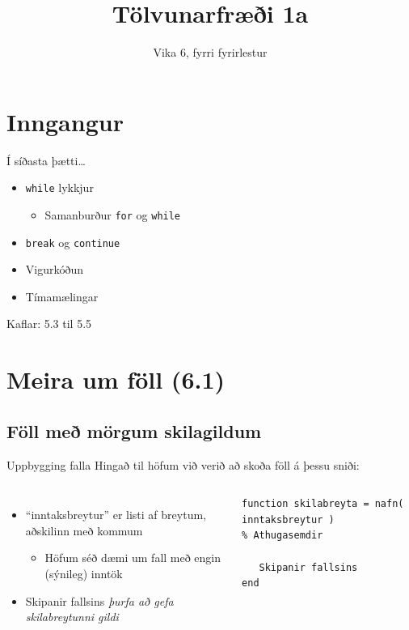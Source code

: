 \documentclass[handout]{beamer}
\title{Tölvunarfræði 1a}
\subtitle{Vika 6, fyrri fyrirlestur}
\begin{document}
\begin{frame}
\titlepage
\end{frame}

\section{Inngangur}

\begin{frame}{Í síðasta þætti\ldots}
\begin{itemize}
 \item \texttt{while} lykkjur
 \begin{itemize}
  \item Samanburður \texttt{for} og \texttt{while}
 \end{itemize}
 \item \texttt{break} og \texttt{continue}
 \item Vigurkóðun
 \item Tímamælingar
\end{itemize}
Kaflar: 5.3 til 5.5
\end{frame}

\section{Meira um föll (6.1)}

\subsection{Föll með mörgum skilagildum}
\begin{frame}[fragile]{Uppbygging falla}
\vspace{\baselineskip}
Hingað til höfum við verið að skoða föll á þessu sniði:
\begin{columns}
\begin{itemize}
 \item ``inntaksbreytur'' er listi af breytum, aðskilinn með kommum
 \begin{itemize}
  \item Höfum séð dæmi um fall með engin (sýnileg) inntök
 \end{itemize}
 \item Skipanir fallsins \emph{þurfa að gefa skilabreytunni gildi}
\end{itemize}
\begin{verbatim}
function skilabreyta = nafn( inntaksbreytur )
% Athugasemdir

   Skipanir fallsins
end 
\end{verbatim}
\end{columns}
\end{frame}
\end{document}
